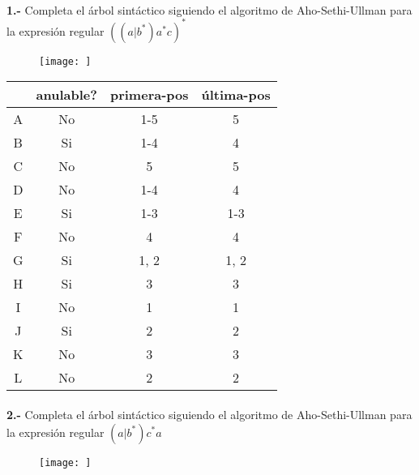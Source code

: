 \documentclass[11pt,a4paper]{report}
\begin{document}
\paragraph{}

\paragraph{}
\textbf{1.-} Completa el árbol sintáctico siguiendo el algoritmo de Aho-Sethi-Ullman para la expresión regular $ ((a|b^*)a^*c)^* $
\begin{figure}[ht!]
\centering
\texttt{[image: ]}
\end{figure}

\begin{tabular} {| c | c | c | c |}\hline
 & anulable? & primera-pos & última-pos\\ \hline
A & No & 1-5 & 5\\ \hline
B & Si & 1-4 & 4\\ \hline
C & No & 5 & 5\\ \hline
D & No & 1-4 & 4\\ \hline
E & Si & 1-3 & 1-3\\ \hline
F & No & 4 & 4\\ \hline
G & Si & 1, 2 & 1, 2\\ \hline
H & Si & 3 & 3\\ \hline
I & No & 1 & 1\\ \hline
J & Si & 2 & 2\\ \hline
K & No & 3 & 3\\ \hline
L & No & 2 & 2\\ \hline
\end{tabular}\paragraph{}
\textbf{2.-} Completa el árbol sintáctico siguiendo el algoritmo de Aho-Sethi-Ullman para la expresión regular $ (a|b^*)c^*a $
\begin{figure}[ht!]
\centering
\texttt{[image: ]}
\end{figure}
\end{document}
